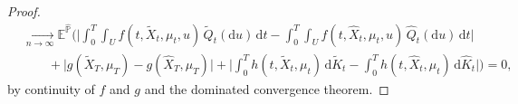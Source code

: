 \documentclass[11pt,amsfonts]{article}
\theoremstyle{plain}
\newtheorem{proposition}{Proposition}
\theoremstyle{assumpstyle}
\numberwithin{equation}{section}
\numberwithin{theorem}{section}
\numberwithin{proposition}{section}
\numberwithin{definition}{section}
\numberwithin{remark}{section}
\numberwithin{corollary}{section}
\numberwithin{lemma}{section}
\begin{document}
\begin{proof}
\begin{align*}
&\xrightarrow[n\to\infty]{} 
\mathbb{E}^{\hat{\mathbb{P}}}\Bigg(
\Big|\int_0^T\int_U f(t,\tilde{X}_t,\mu_t,u)\,\tilde{Q}_t(\mathrm{d}u)\,\mathrm{d}t
 -\int_0^T\int_U f(t,\hat{X}_t,\mu_t,u)\,\hat{Q}_t(\mathrm{d}u)\,\mathrm{d}t \Big| \\
&\qquad + \Big|g(\tilde{X}_T,\mu_T)-g(\hat{X}_T,\mu_T)\Big|
 + \Big|\int_0^T h(t,\tilde{X}_t,\mu_t)\,\mathrm{d}\tilde{K}_t - \int_0^T h(t, \hat{X}_t,\mu_t)\,\mathrm{d}\hat{K}_t\Big| \Bigg)=0,
\end{align*}
by continuity of $f$ and $g$ and the dominated convergence theorem.
\end{proof}

\end{document}
